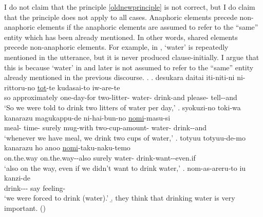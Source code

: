 I do not claim that the principle \ref{oldnewprinciple} is not correct,
but I do claim that the principle does not apply to all cases.
Anaphoric elements precede non-anaphoric elements
if the anaphoric elements are assumed to refer to the ``same'' entity which has been already mentioned.
In other words,
shared elements precede non-anaphoric elements.
For example, in \Next,
 `water' is repeatedly mentioned in the utterance,
but it is never produced clause-initially.
I argue that this is because
 `water' in \Next[b] and later is not assumed to refer to the ``same'' entity already mentioned in the previous discourse.
%
\ex.\label{WO:ClauseInit:Given:mizu}
 \ag. desukara daitai iti-niti-ni ni-rittoru-no  \ul{tot}-te kudasai-to iw-are-te \\
 so approximately one-day-for two-litter- water- drink-and please- tell--and \\
 `So we were told to drink two litters of water per day,'
 \bg. syokuzi-no toki-wa kanarazu magukappu-de ni-hai-bun-no  \ul{nomi}-masu-si \\
 	meal- time- surely mug-with two-cup-amount- water- drink--and \\
	`whenever we have meal, we drink two cups of water,'
 \bg. totyuu totyuu-de-mo kanarazu  ho anoo \ul{nomi}-taku-naku-temo \\
 		on.the.way on.the.way--also surely water-   drink-want--even.if \\
		`also on the way, even if we didn't want to drink water,'
 \bg. nom-as-areru-to iu kanzi-de \\
 	drink--- say feeling- \\
	`we were forced to drink (water).'
 \b. they think that drinking water is very important.
  \hfill{()}


